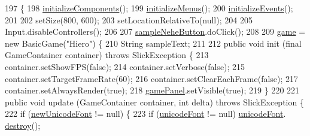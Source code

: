 \begin{DoxyCode}
197                                              \{
198         \mbox{\hyperlink{classorg_1_1newdawn_1_1slick_1_1tools_1_1hiero_1_1_hiero_ab1e8c9a0d3d58decc8b860636d0d1606}{initializeComponents}}();
199         \mbox{\hyperlink{classorg_1_1newdawn_1_1slick_1_1tools_1_1hiero_1_1_hiero_ace24ef1ee06277ff6a8437c249617e1d}{initializeMenus}}();
200         \mbox{\hyperlink{classorg_1_1newdawn_1_1slick_1_1tools_1_1hiero_1_1_hiero_a542832d2b6b94a4fd1277d889b4ef8e2}{initializeEvents}}();
201 
202         setSize(800, 600);
203         setLocationRelativeTo(null);
204 
205         Input.disableControllers();
206 
207         \mbox{\hyperlink{classorg_1_1newdawn_1_1slick_1_1tools_1_1hiero_1_1_hiero_a52c15e38f26347d1de7fc7ae6c87804f}{sampleNeheButton}}.doClick();
208 
209         \mbox{\hyperlink{classorg_1_1newdawn_1_1slick_1_1tools_1_1hiero_1_1_hiero_a447034c1ec539650e7cd60cdfdeead33}{game}} = \textcolor{keyword}{new} BasicGame(\textcolor{stringliteral}{"Hiero"}) \{
210             String sampleText;
211 
212             \textcolor{keyword}{public} \textcolor{keywordtype}{void} init (\textcolor{keyword}{final} GameContainer container) \textcolor{keywordflow}{throws} SlickException \{
213                 container.setShowFPS(\textcolor{keyword}{false});
214                 container.setVerbose(\textcolor{keyword}{false});
215                 container.setTargetFrameRate(60);
216                 container.setClearEachFrame(\textcolor{keyword}{false});
217                 container.setAlwaysRender(\textcolor{keyword}{true});
218                 \mbox{\hyperlink{classorg_1_1newdawn_1_1slick_1_1tools_1_1hiero_1_1_hiero_a2ce748cacd6def18f0e72fc5a139518c}{gamePanel}}.setVisible(\textcolor{keyword}{true});
219             \}
220 
221             \textcolor{keyword}{public} \textcolor{keywordtype}{void} update (GameContainer container, \textcolor{keywordtype}{int} delta) \textcolor{keywordflow}{throws} SlickException \{
222                 \textcolor{keywordflow}{if} (\mbox{\hyperlink{classorg_1_1newdawn_1_1slick_1_1tools_1_1hiero_1_1_hiero_a460520e36f2d16d14c0478c45960a632}{newUnicodeFont}} != null) \{
223                     \textcolor{keywordflow}{if} (\mbox{\hyperlink{classorg_1_1newdawn_1_1slick_1_1tools_1_1hiero_1_1_hiero_a655ba3408dfa898a78d246f3da30f19c}{unicodeFont}} != null) \mbox{\hyperlink{classorg_1_1newdawn_1_1slick_1_1tools_1_1hiero_1_1_hiero_a655ba3408dfa898a78d246f3da30f19c}{unicodeFont}}.
      \mbox{\hyperlink{classorg_1_1newdawn_1_1slick_1_1_unicode_font_a41c92f27f67ef3ec3ce7b6849c0d6612}{destroy}}();

\end{DoxyCode}
